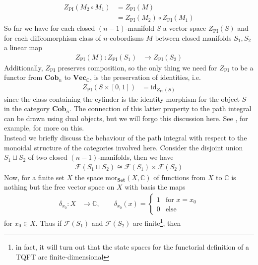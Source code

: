 \begin{align*}
  Z_{\mathrm{PI}}(M_{2} \circ M_{1})
  &=
  Z_{\mathrm{PI}}(M)
  \\
  &=
  Z_{\mathrm{PI}}(M_{2})
  \circ
  Z_{\mathrm{PI}}(M_{1})
\end{align*}
So far we have for each closed $(n-1)$-manifold $S$ a vector space $Z_{\mathrm{PI}}(S)$ and for each diffeomorphism class of $n$-cobordisms $M$ between closed manifolds $S_{1},S_{2}$ a linear map
\begin{align*}
  Z_{\mathrm{PI}}(M)
  \colon
  Z_{\mathrm{PI}}(S_{1})
  &\to
  Z_{\mathrm{PI}}(S_{2})
\end{align*}
Additionally, $Z_{\mathrm{PI}}$ preserves composition, so the only thing we need for $Z_{\mathrm{PI}}$ to be a functor from $\mathbf{Cob}_{n}$ to $\mathbf{Vec}_{\mathbb{C}}$, is the preservation of identities, i.e.
\begin{align*}
  Z_{\mathrm{PI}}(S \times [0,1])
  &=
  \mathrm{id}_{Z_{\mathrm{PI}}(S)}
\end{align*}
since the class containing the cylinder is the identity morphism for the object $S$ in the category $\mathbf{Cob}_{n}$. The connection of this latter property to the path integral can be drawn using dual objects, but we will forgo this discussion here. See \cite{0a816f4c}, for example, for more on this.
\\
Instead we briefly discuss the behaviour of the path integral with respect to the monoidal structure of the categories involved here. Consider the disjoint union $S_{1} \sqcup S_{2}$ of two closed $(n-1)$-manifolds, then we have
\begin{align*}
  \mathcal{F}(S_{1} \sqcup S_{2})
  \cong
  \mathcal{F}(S_{1})
  \times
  \mathcal{F}(S_{2})
\end{align*}
Now, for a finite set $X$ the space $\mathrm{mor}_{\mathbf{Set}}(X,\mathbb{C})$ of functions from $X$ to $\mathbb{C}$ is nothing but the free vector space on $X$ with basis the maps
\begin{align*}
  \delta_{x_{0}}
  \colon
  X
  &\to
  \mathbb{C}
  ,\qquad
  \delta_{x_{0}}(x)
  =
  \begin{cases}
    1
    &\text{for }
    x
    =
    x_{0}
    \\
    0
    &\text{else}
  \end{cases}
\end{align*}
for $x_{0} \in X$. Thus if $\mathcal{F}(S_{1})$ and $\mathcal{F}(S_{2})$ are finite\footnote{in fact, it will turn out that the state spaces for the functorial definition of a TQFT are finite-dimensional}, then
